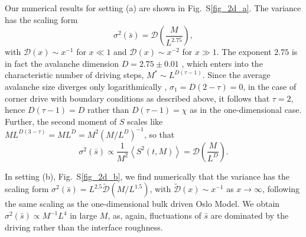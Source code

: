 \documentclass[doublecol]{epl2}
\begin{document}
Our numerical results for setting (a) are shown in Fig.~S\ref{fig_2d_a}. The variance has the scaling form
\begin{equation}
\sigma^2(\bar{s}) = \mathcal{D}\left(\frac{M}{L^{2.75}}\right),
\end{equation}
with $\mathcal{D}(x)\sim x^{-1}$ for $x\ll1$ and $\mathcal{D}(x)\sim x^{-2}$ for $x\gg1$. The exponent $2.75$ is in fact the avalanche dimension
$D=2.75\pm0.01$ \cite{pruessner2012self, PhysRevE.78.041102, lubeck2000moment,
paczuski1996avalanche}, which enters into the characteristic number of driving steps, $M^*\sim L^{D(\tau-1)}$. Since the average avalanche size diverges only logarithmically \cite{pruessner2012self}, $\sigma_1=D(2-\tau)=0$, in the case of corner drive with boundary conditions as described above, it follows that $\tau=2$, hence $D(\tau-1)=D$ rather than $D(\tau -1) = \chi$ as in the one-dimensional case. Further, the second moment of $S$ scales like $ML^{D(3-\tau)}=ML^D = M^2\left(M/L^D\right)^{-1}$, so that
\begin{equation}
\sigma^2(\bar{s}) \propto \frac{1}{M^2}\left\langle S^2(t,M)\right\rangle = \mathcal{D}\left(\frac{M}{L^{D}}\right).
\end{equation}

In setting (b), Fig.~S\ref{fig_2d_b}, we find numerically that the variance has the scaling form
$\sigma^2(\bar{s}) = L^{2.5}\tilde{\mathcal{D}}\left({M}/{L^{1.5}}\right)$,
with $\tilde{\mathcal{D}}(x)\sim x^{-1}$ as $x\to\infty$,
following the same scaling as the one-dimensional bulk driven Oslo Model. We obtain $\sigma^2(\bar{s})\propto M^{-1}L^4$ in large $M$, as, again, fluctuations of $\bar{s}$ are dominated by the driving rather than the interface roughness.
\end{document}
